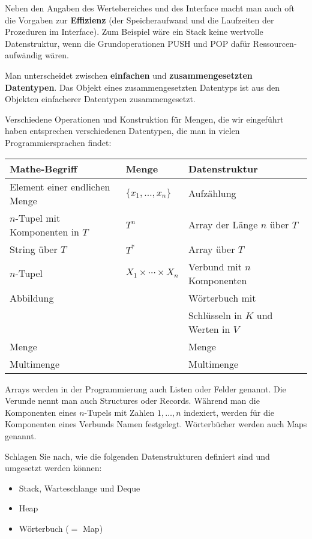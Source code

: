 \begin{bem}
	Neben den Angaben des Wertebereiches und des Interface macht man auch oft die Vorgaben zur \textbf{Effizienz} 	(der Speicheraufwand und die Laufzeiten der Prozeduren im Interface). Zum Beispiel wäre ein Stack keine wertvolle Datenstruktur, wenn die Grundoperationen PUSH und POP dafür Ressourcen-aufwändig wären. 
\end{bem} 

\begin{bem}
	Man unterscheidet zwischen \textbf{einfachen} und \textbf{zusammengesetzten Datentypen}. Das Objekt eines zusammengesetzten Datentyps ist aus den Objekten einfacherer Datentypen zusammengesetzt.  
\end{bem} 

\begin{bem}
	Verschiedene Operationen und Konstruktion für Mengen, die wir eingeführt haben entsprechen verschiedenen Datentypen, die man in vielen Programmiersprachen findet: 
	\begin{center} 
		\small  
	\begin{tabular}{l|l|l}
			Mathe-Begriff & Menge & Datenstruktur
			\\ \hline 
			Element einer endlichen Menge & $\{x_1,\ldots,x_n\}$ & Aufzählung 
			\\ $n$-Tupel mit Komponenten in $T$ & $T^n$ & Array der Länge $n$ über $T$ 
			\\ String über $T$ & $T^\ast$ & Array über $T$
			\\ $n$-Tupel & $X_1 \times \cdots \times X_n$ & Verbund mit $n$ Komponenten
			\\ Abbildung &  & Wörterbuch mit 
			\\ & & Schlüsseln in $K$ und Werten in $V$
			\\ Menge & & Menge
			\\ Multimenge & & Multimenge 
	\end{tabular} 
	\end{center}
Arrays werden in der Programmierung auch Listen oder Felder genannt. Die Verunde nennt man auch Structures oder Records. Während man die Komponenten eines $n$-Tupels mit Zahlen $1,\ldots,n$ indexiert, werden für die Komponenten eines Verbunds Namen festgelegt.  Wörterbücher werden auch Maps genannt. 
\end{bem} 

\begin{aufg}
	Schlagen Sie nach, wie die folgenden Datenstrukturen definiert sind und umgesetzt werden können: 
	\begin{itemize}
			\item Stack, Warteschlange und Deque
			\item Heap 
			\item Wörterbuch ($=$ Map)
	\end{itemize} 
\end{aufg} 


